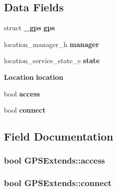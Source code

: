 \subsection*{Data Fields}
\begin{DoxyCompactItemize}
\item 
struct {\bf \-\_\-gps} {\bfseries gps}\label{structGPSExtends_a3104ebe071c6faeb09e5bec08008ccf1}

\item 
location\-\_\-manager\-\_\-h {\bfseries manager}\label{structGPSExtends_ac711550fe701c89fd68787a9fbff6eb3}

\item 
location\-\_\-service\-\_\-state\-\_\-e {\bfseries state}\label{structGPSExtends_afb3826794b21a68540785e1b6ea55337}

\item 
{\bf Location} {\bfseries location}\label{structGPSExtends_af846e1fbb68747cfbcd39fba3e1cc39a}

\item 
bool {\bfseries access}\label{structGPSExtends_a100e1cad3432b6430f9e617c562a771d}

\item 
bool {\bfseries connect}\label{structGPSExtends_aaa899e96d674affb7c8566cbf0064876}

\end{DoxyCompactItemize}


\subsection{Field Documentation}
\subsubsection[{access}]{\setlength{\rightskip}{0pt plus 5cm}bool G\-P\-S\-Extends\-::access}\label{structGPSExtends_a100e1cad3432b6430f9e617c562a771d}
\subsubsection[{connect}]{\setlength{\rightskip}{0pt plus 5cm}bool G\-P\-S\-Extends\-::connect}\label{structGPSExtends_aaa899e96d674affb7c8566cbf0064876}
